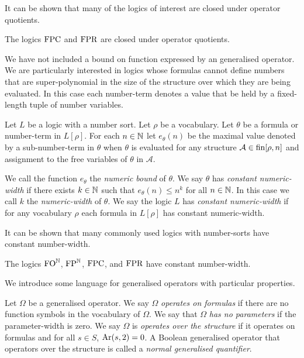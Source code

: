 \documentclass[../main/thesis.tex]{subfiles}
\begin{document}
It can be shown that many of the logics of interest are closed under operator
quotients.

\begin{lem}
  The logics $\text{\upshape FPC}$ and $\text{\upshape FPR}$ are closed under operator quotients.
  \label{lem:logics-operator-quotients}
\end{lem}

We have not included a bound on function expressed by an generalised operator.
We are particularly interested in logics whose formulas cannot define numbers
that are super-polynomial in the size of the structure over which they are being
evaluated. In this case each number-term denotes a value that be held by a
fixed-length tuple of number variables.

\begin{definition}
  Let $L$ be a logic with a number sort. Let $\rho$ be a vocabulary. Let
  $\theta$ be a formula or number-term in $L[\rho]$. For each $n \in \mathbb{N}$ let
  $e_{\theta}(n)$ be the maximal value denoted by a sub-number-term in $\theta$
  when $\theta$ is evaluated for any structure $\mathcal{A} \in \text{\upshape fin}[\rho, n]$
  and assignment to the free variables of $\theta$ in $\mathcal{A}$.

  We call the function $e_{\theta}$ the \emph{numeric bound} of $\theta$. We say
  $\theta$ has \emph{constant numeric-width} if there exists $k \in \mathbb{N}$ such
  that $e_{\theta}(n) \leq n^k$ for all $n \in \mathbb{N}$. In this case we call $k$
  the \emph{numeric-width} of $\theta$. We say the logic $L$ has \emph{constant
    numeric-width} if for any vocabulary $\rho$ each formula in $L[\rho]$ has
  constant numeric-width.
\end{definition}

It can be shown that many commonly used logics with number-sorts have constant
number-width.

\begin{lem}
  The logics $\text{\upshape FO}^{\mathbb{N}}$, $\text{\upshape FP}^{\mathbb{N}}$, $\text{\upshape FPC}$, and $\text{\upshape FPR}$ have constant
  number-width.
  \label{lem:logics-constant-number-width}
\end{lem}

We introduce some language for generalised operators with particular properties.

\begin{definition}
  Let $\Omega$ be a generalised operator. We say $\Omega$ \emph{operates on
    formulas} if there are no function symbols in the vocabulary of $\Omega$. We
  say that $\Omega$ \emph{has no parameters} if the parameter-width is zero. We
  say $\Omega$ is \emph{operates over the structure} if it operates on formulas
  and for all $s \in S$, $\text{\upshape Ar}(s, 2) = 0$. A Boolean generalised operator that
  operators over the structure is called a \emph{normal generalised quantifier}.
\end{definition}
\end{document}
